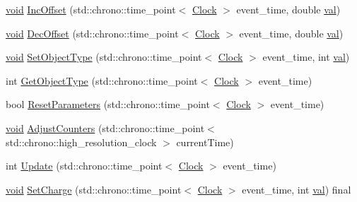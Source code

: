 \begin{DoxyCompactItemize}
\item 
\mbox{\hyperlink{glad_8h_a950fc91edb4504f62f1c577bf4727c29}{void}} \mbox{\hyperlink{class_dimension_aaf18cc220562b30f9e7aee92f16cc08e}{Inc\+Offset}} (std\+::chrono\+::time\+\_\+point$<$ \mbox{\hyperlink{universe_8h_a0ef8d951d1ca5ab3cfaf7ab4c7a6fd80}{Clock}} $>$ event\+\_\+time, double \mbox{\hyperlink{glad_8h_a26942fd2ed566ef553eae82d2c109c8f}{val}})
\item 
\mbox{\hyperlink{glad_8h_a950fc91edb4504f62f1c577bf4727c29}{void}} \mbox{\hyperlink{class_dimension_a2017e62d4b3caf31f4f1b6b5cf59a798}{Dec\+Offset}} (std\+::chrono\+::time\+\_\+point$<$ \mbox{\hyperlink{universe_8h_a0ef8d951d1ca5ab3cfaf7ab4c7a6fd80}{Clock}} $>$ event\+\_\+time, double \mbox{\hyperlink{glad_8h_a26942fd2ed566ef553eae82d2c109c8f}{val}})
\item 
\mbox{\hyperlink{glad_8h_a950fc91edb4504f62f1c577bf4727c29}{void}} \mbox{\hyperlink{class_dimension_a484621a7c6f9b43f6e251ba04e0fdf8b}{Set\+Object\+Type}} (std\+::chrono\+::time\+\_\+point$<$ \mbox{\hyperlink{universe_8h_a0ef8d951d1ca5ab3cfaf7ab4c7a6fd80}{Clock}} $>$ event\+\_\+time, int \mbox{\hyperlink{glad_8h_a26942fd2ed566ef553eae82d2c109c8f}{val}})
\item 
int \mbox{\hyperlink{class_dimension_a72f494215a114cb43cecd9b170bcde51}{Get\+Object\+Type}} (std\+::chrono\+::time\+\_\+point$<$ \mbox{\hyperlink{universe_8h_a0ef8d951d1ca5ab3cfaf7ab4c7a6fd80}{Clock}} $>$ event\+\_\+time)
\item 
bool \mbox{\hyperlink{class_dimension_af83732dba929ae01aca457e7d6121374}{Reset\+Parameters}} (std\+::chrono\+::time\+\_\+point$<$ \mbox{\hyperlink{universe_8h_a0ef8d951d1ca5ab3cfaf7ab4c7a6fd80}{Clock}} $>$ event\+\_\+time)
\item 
\mbox{\hyperlink{glad_8h_a950fc91edb4504f62f1c577bf4727c29}{void}} \mbox{\hyperlink{class_dimension_a31e28c2777888449fad32843f6dd15ed}{Adjust\+Counters}} (std\+::chrono\+::time\+\_\+point$<$ std\+::chrono\+::high\+\_\+resolution\+\_\+clock $>$ current\+Time)
\item 
int \mbox{\hyperlink{class_dimension_a663916c2573b6df4db02ccee5678a75d}{Update}} (std\+::chrono\+::time\+\_\+point$<$ \mbox{\hyperlink{universe_8h_a0ef8d951d1ca5ab3cfaf7ab4c7a6fd80}{Clock}} $>$ event\+\_\+time)
\item 
\mbox{\hyperlink{glad_8h_a950fc91edb4504f62f1c577bf4727c29}{void}} \mbox{\hyperlink{class_dimension_a6d3f7fa4a26b92d8ae6161a1b8bb8220}{Set\+Charge}} (std\+::chrono\+::time\+\_\+point$<$ \mbox{\hyperlink{universe_8h_a0ef8d951d1ca5ab3cfaf7ab4c7a6fd80}{Clock}} $>$ event\+\_\+time, int \mbox{\hyperlink{glad_8h_a26942fd2ed566ef553eae82d2c109c8f}{val}}) final

\end{DoxyCompactItemize}
